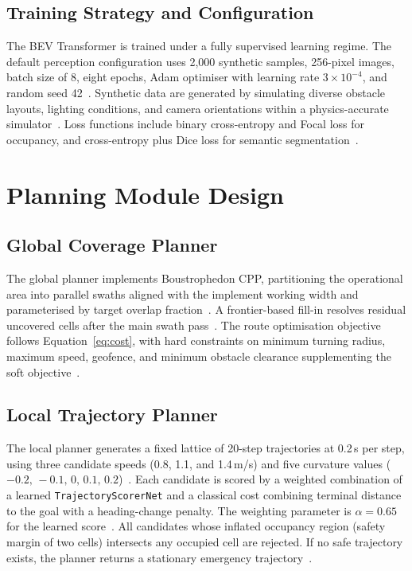 \documentclass[12pt, a4paper]{article}
\begin{document}
\subsection{Training Strategy and Configuration}

The BEV Transformer is trained under a fully supervised learning regime. The default
perception configuration uses 2,000 synthetic samples, 256-pixel images, batch size of 8,
eight epochs, Adam optimiser with learning rate $3\!\times\!10^{-4}$, and random seed
42~\cite{ref234}. Synthetic data are generated by simulating diverse obstacle layouts,
lighting conditions, and camera orientations within a physics-accurate
simulator~\cite{ref1, ref233}. Loss functions include binary cross-entropy and Focal loss
for occupancy, and cross-entropy plus Dice loss for semantic segmentation~\cite{ref233}.

\section{Planning Module Design}

\subsection{Global Coverage Planner}

The global planner implements Boustrophedon CPP, partitioning the operational area into
parallel swaths aligned with the implement working width and parameterised by target
overlap fraction~\cite{ref1, ref138, ref233}. A frontier-based fill-in resolves residual
uncovered cells after the main swath pass~\cite{ref1}. The route optimisation objective
follows Equation~\eqref{eq:cost}, with hard constraints on minimum turning radius,
maximum speed, geofence, and minimum obstacle clearance supplementing the soft
objective~\cite{ref2}.

\subsection{Local Trajectory Planner}

The local planner generates a fixed lattice of 20-step trajectories at 0.2\,s per step,
using three candidate speeds (0.8, 1.1, and 1.4\,m/s) and five curvature values
($-0.2,\,-0.1,\,0,\,0.1,\,0.2$)~\cite{ref234}. Each candidate is scored by a weighted
combination of a learned \texttt{TrajectoryScorerNet} and a classical cost combining
terminal distance to the goal with a heading-change penalty. The weighting parameter is
$\alpha\!=\!0.65$ for the learned score~\cite{ref234}. All candidates whose inflated
occupancy region (safety margin of two cells) intersects any occupied cell are rejected.
If no safe trajectory exists, the planner returns a stationary emergency
trajectory~\cite{ref234}.
\end{document}
